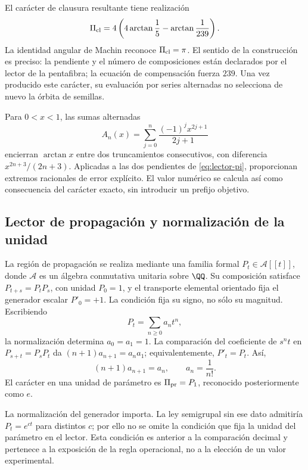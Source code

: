 El carácter de clausura resultante tiene realización
\begin{equation}
 \Pi_{\rm cl}=4\left(4\arctan\frac15-\arctan\frac1{239}\right).
 \label{eq:lector-pi}
\end{equation}
La identidad angular de Machin reconoce \(\Pi_{\rm cl}=\pi\). El sentido de la construcción es preciso: la pendiente y el número de composiciones están declarados por el lector de la pentafibra; la ecuación de compensación fuerza \(239\). Una vez producido este carácter, su evaluación por series alternadas no selecciona de nuevo la órbita de semillas.

Para \(0<x<1\), las sumas alternadas
\[
 A_n(x)=\sum_{j=0}^n\frac{(-1)^jx^{2j+1}}{2j+1}
\]
encierran \(\arctan x\) entre dos truncamientos consecutivos, con diferencia \(x^{2n+3}/(2n+3)\). Aplicadas a las dos pendientes de \eqref{eq:lector-pi}, proporcionan extremos racionales de error explícito. El valor numérico se calcula así como consecuencia del carácter exacto, sin introducir un prefijo objetivo.

\subsection{Lector de propagación y normalización de la unidad}

La región de propagación se realiza mediante una familia formal \(P_t\in\mathcal A[[t]]\), donde \(\mathcal A\) es un álgebra conmutativa unitaria sobre \(\QQ\). Su composición satisface \(P_{t+s}=P_tP_s\), con unidad \(P_0=1\), y el transporte elemental orientado fija el generador escalar \(P'_0=+1\). La condición fija su signo, no sólo su magnitud. Escribiendo
\[
 P_t=\sum_{n\ge0}a_nt^n,
\]
la normalización determina \(a_0=a_1=1\). La comparación del coeficiente de \(s^nt\) en \(P_{s+t}=P_sP_t\) da \((n+1)a_{n+1}=a_na_1\); equivalentemente, \(P'_t=P_t\). Así,
\begin{equation}
 (n+1)a_{n+1}=a_n,\qquad a_n=\frac1{n!}.
 \label{eq:propagacion}
\end{equation}
El carácter en una unidad de parámetro es \(\Pi_{\rm pr}=P_1\), reconocido posteriormente como \(e\).

La normalización del generador importa. La ley semigrupal sin ese dato admitiría \(P_t=e^{ct}\) para distintos \(c\); por ello no se omite la condición que fija la unidad del parámetro en el lector. Esta condición es anterior a la comparación decimal y pertenece a la exposición de la regla operacional, no a la elección de un valor experimental.

